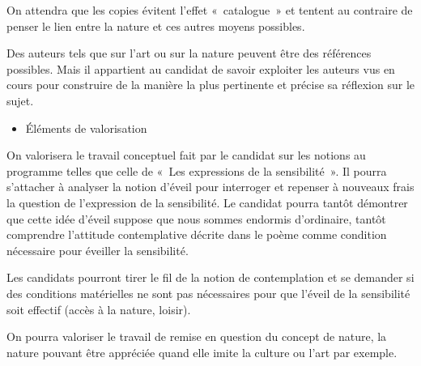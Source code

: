{On attendra que les copies évitent l'effet «~catalogue~» et tentent au contraire de
penser le lien entre la nature et ces autres moyens possibles.

Des auteurs tels que  sur l'art ou  sur la nature peuvent être des
références possibles. Mais il appartient au candidat de savoir exploiter les auteurs vus
en cours pour construire de la manière la plus pertinente et précise sa réflexion sur le
sujet.

\begin{itemize}[label=\textbullet]
\item Éléments de valorisation
\end{itemize}

On valorisera le travail conceptuel fait par le candidat sur les notions au programme
telles que celle de «~Les expressions de la sensibilité~». Il pourra s'attacher à analyser
la notion d'éveil pour interroger et repenser à nouveaux frais la question de
l'expression de la sensibilité. Le candidat pourra tantôt démontrer que cette idée d'éveil
suppose que nous sommes endormis d'ordinaire, tantôt comprendre l'attitude
contemplative décrite dans le poème comme condition nécessaire pour éveiller la
sensibilité.

Les candidats pourront tirer le fil de la notion de contemplation et se demander si des
conditions matérielles ne sont pas nécessaires pour que l'éveil de la sensibilité soit
effectif (accès à la nature, loisir).

On pourra valoriser le travail de remise en question du concept de nature, la nature
pouvant être appréciée quand elle imite la culture ou l'art par exemple.}


